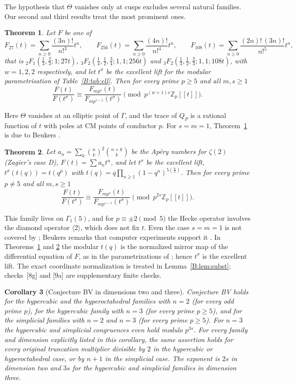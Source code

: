 \documentclass[11pt,a4paper]{article}
\newtheorem{theorem}{Theorem}[section]
\newtheorem{corollary}[theorem]{Corollary}
\theoremstyle{definition}\newtheorem{definition}[theorem]{Definition}
\theoremstyle{remark}\newtheorem{remark}[theorem]{Remark}
\newcommand{\Z}{\mathbb Z}
\numberwithin{equation}{section}
\begin{document}
The hypothesis that $\Theta$ vanishes only at cusps excludes several natural families. Our second and third results treat
the most prominent ones.

\begin{theorem}\label{B:thm:ell}
Let $F$ be one of
\[
F_{27}(t)=\sum_{n\ge0}\frac{(3n)!}{n!^3}t^n,\qquad F_{256}(t)=\sum_{n\ge0}\frac{(4n)!}{n!^4}t^n,\qquad
F_{108}(t)=\sum_{n\ge0}\frac{(2n)!\,(3n)!}{n!^5}t^n,
\]
that is ${}_2F_1(\frac13,\frac23;1;27t)$, ${}_3F_2(\frac14,\frac12,\frac34;1,1;256t)$ and
${}_3F_2(\frac13,\frac12,\frac23;1,1;108t)$, with $w=1,2,2$ respectively, and let $t^\sigma$ be the excellent lift for the
modular parametrisation of Table~\ref{B:tab:ell}. Then for every prime $p\ge5$ and all $m,s\ge1$
\[
\frac{F(t)}{F(t^\sigma)}\equiv\frac{F_{mp^s}(t)}{F_{mp^{s-1}}(t^\sigma)}\pmod{p^{(w+1)s}\Z_p[[t]]}.
\]
\end{theorem}

Here $\Theta$ vanishes at an elliptic point of $\Gamma$, and the trace of $Q_P$ is a rational function of $t$ with poles at CM
points of conductor $p$. For $s=m=1$, Theorem~\ref{B:thm:ell} is due to Beukers \cite[Thms.~1.4, 1.13 and Cor.~6.2]{Beu26}.

\begin{theorem}\label{B:thm:D}
Let $a_n=\sum_k\binom nk^2\binom{n+k}k$ be the Ap\'ery numbers for $\zeta(2)$ (Zagier's case D), $F(t)=\sum a_nt^n$, and
let $t^\sigma$ be the excellent lift, $t^\sigma(t(q))=t(q^p)$ with $t(q)=q\prod_{n\ge1}(1-q^n)^{5(\frac n5)}$. Then for
every prime $p\ne5$ and all $m,s\ge1$
\[
\frac{F(t)}{F(t^\sigma)}\equiv\frac{F_{mp^s}(t)}{F_{mp^{s-1}}(t^\sigma)}\pmod{p^{2s}\Z_p[[t]]}.
\]
\end{theorem}

This family lives on $\Gamma_1(5)$, and for $p\equiv\pm2\pmod5$ the Hecke operator involves the diamond operator
$\langle2\rangle$, which does not fix $t$. Even the case $s=m=1$ is not covered by \cite[Thm.~1.4]{Beu26}; Beukers
remarks that computer experiments support it \cite[Remark~1.3]{Beu26}. In Theorems~\ref{B:thm:ell} and \ref{B:thm:D} the
modular $t(q)$ is the normalized mirror map of the differential equation of $F$, as in the parametrizations of \cite[Appendices B--C]{Beu26}; hence $t^\sigma$ is the excellent lift. The exact coordinate normalization is treated in Lemma~\ref{B:lem:subst}; checks~[8g] and [9a] are supplementary finite checks.

\begin{corollary}[Conjecture BV in dimensions two and three]\label{B:cor:BV}
Conjecture BV holds for the hypercubic and the hyperoctahedral families with $n=2$ (for every odd prime $p$), for the
hypercubic family with $n=3$ (for every prime $p\ge5$), and for the simplicial families with $n=2$ and $n=3$ (for every
prime $p\ge5$). For $n=3$ the hypercubic and simplicial congruences even hold modulo $p^{3s}$. For every family and dimension explicitly listed in this corollary, the same assertion holds for every original truncation multiplier divisible by $2$ in the hypercubic or hyperoctahedral case, or by $n+1$ in the simplicial case. The exponent is $2s$ in dimension two and $3s$ for the hypercubic and simplicial families in dimension three.
\end{corollary}
\end{document}

